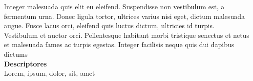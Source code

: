 Integer malesuada quis elit eu eleifend. Suspendisse non vestibulum est, a fermentum urna. Donec\autocite{WelcomeLightFMDocumentation} ligula tortor, ultrices varius nisi eget, dictum malesuada augue. Fusce lacus orci, eleifend quis luctus dictum, ultricies id turpis. Vestibulum et auctor orci. Pellentesque habitant morbi tristique senectus et netus et malesuada fames ac turpis egestas. Integer facilisis neque quis dui dapibus dictums
\\





\textbf{Descriptores}\\
Lorem, ipsum, dolor, sit, amet
